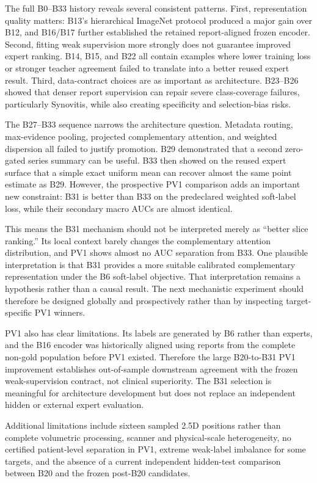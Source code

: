 \documentclass[preprint,12pt]{elsarticle}
\begin{document}
The full B0--B33 history reveals several consistent patterns. First, representation quality matters: B13's hierarchical ImageNet protocol produced a major gain over B12, and B16/B17 further established the retained report-aligned frozen encoder. Second, fitting weak supervision more strongly does not guarantee improved expert ranking. B14, B15, and B22 all contain examples where lower training loss or stronger teacher agreement failed to translate into a better reused expert result. Third, data-contract choices are as important as architecture. B23--B26 showed that denser report supervision can repair severe class-coverage failures, particularly Synovitis, while also creating specificity and selection-bias risks.

The B27--B33 sequence narrows the architecture question. Metadata routing, max-evidence pooling, projected complementary attention, and weighted dispersion all failed to justify promotion. B29 demonstrated that a second zero-gated series summary can be useful. B33 then showed on the reused expert surface that a simple exact uniform mean can recover almost the same point estimate as B29. However, the prospective PV1 comparison adds an important new constraint: B31 is better than B33 on the predeclared weighted soft-label loss, while their secondary macro AUCs are almost identical.

This means the B31 mechanism should not be interpreted merely as ``better slice ranking.'' Its local context barely changes the complementary attention distribution, and PV1 shows almost no AUC separation from B33. One plausible interpretation is that B31 provides a more suitable calibrated complementary representation under the B6 soft-label objective. That interpretation remains a hypothesis rather than a causal result. The next mechanistic experiment should therefore be designed globally and prospectively rather than by inspecting target-specific PV1 winners.

PV1 also has clear limitations. Its labels are generated by B6 rather than experts, and the B16 encoder was historically aligned using reports from the complete non-gold population before PV1 existed. Therefore the large B20-to-B31 PV1 improvement establishes out-of-sample downstream agreement with the frozen weak-supervision contract, not clinical superiority. The B31 selection is meaningful for architecture development but does not replace an independent hidden or external expert evaluation.

Additional limitations include sixteen sampled 2.5D positions rather than complete volumetric processing, scanner and physical-scale heterogeneity, no certified patient-level separation in PV1, extreme weak-label imbalance for some targets, and the absence of a current independent hidden-test comparison between B20 and the frozen post-B20 candidates.
\end{document}
